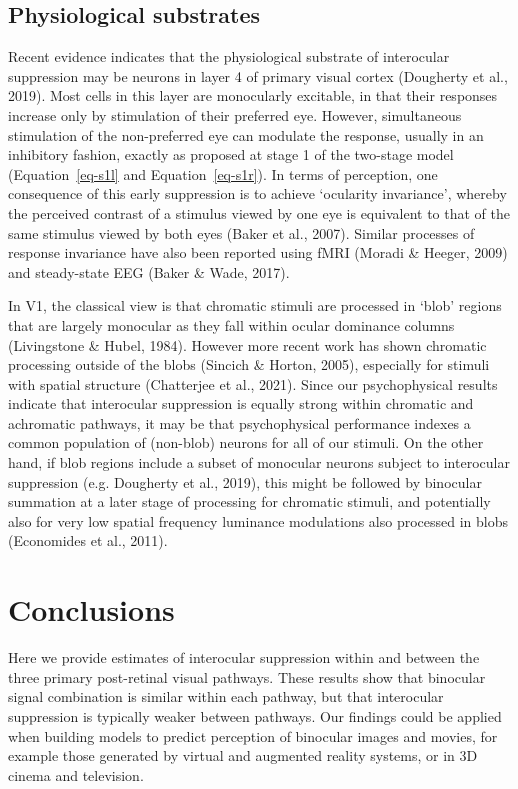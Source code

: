 \documentclass[
  letterpaper,
  DIV=11,
  numbers=noendperiod]{scrartcl}
\begin{document}
\hypertarget{physiological-substrates}{%
\subsection{Physiological substrates}\label{physiological-substrates}}

Recent evidence indicates that the physiological substrate of
interocular suppression may be neurons in layer 4 of primary visual
cortex (Dougherty et al., 2019). Most cells in this layer are
monocularly excitable, in that their responses increase only by
stimulation of their preferred eye. However, simultaneous stimulation of
the non-preferred eye can modulate the response, usually in an
inhibitory fashion, exactly as proposed at stage 1 of the two-stage
model (Equation~\ref{eq-s1l} and Equation~\ref{eq-s1r}). In terms of
perception, one consequence of this early suppression is to achieve
`ocularity invariance', whereby the perceived contrast of a stimulus
viewed by one eye is equivalent to that of the same stimulus viewed by
both eyes (Baker et al., 2007). Similar processes of response invariance
have also been reported using fMRI (Moradi \& Heeger, 2009) and
steady-state EEG (Baker \& Wade, 2017).

In V1, the classical view is that chromatic stimuli are processed in
`blob' regions that are largely monocular as they fall within ocular
dominance columns (Livingstone \& Hubel, 1984). However more recent work
has shown chromatic processing outside of the blobs (Sincich \& Horton,
2005), especially for stimuli with spatial structure (Chatterjee et al.,
2021). Since our psychophysical results indicate that interocular
suppression is equally strong within chromatic and achromatic pathways,
it may be that psychophysical performance indexes a common population of
(non-blob) neurons for all of our stimuli. On the other hand, if blob
regions include a subset of monocular neurons subject to interocular
suppression (e.g. Dougherty et al., 2019), this might be followed by
binocular summation at a later stage of processing for chromatic
stimuli, and potentially also for very low spatial frequency luminance
modulations also processed in blobs (Economides et al., 2011).

\hypertarget{conclusions}{%
\section{Conclusions}\label{conclusions}}

Here we provide estimates of interocular suppression within and between
the three primary post-retinal visual pathways. These results show that
binocular signal combination is similar within each pathway, but that
interocular suppression is typically weaker between pathways. Our
findings could be applied when building models to predict perception of
binocular images and movies, for example those generated by virtual and
augmented reality systems, or in 3D cinema and television.
\end{document}
